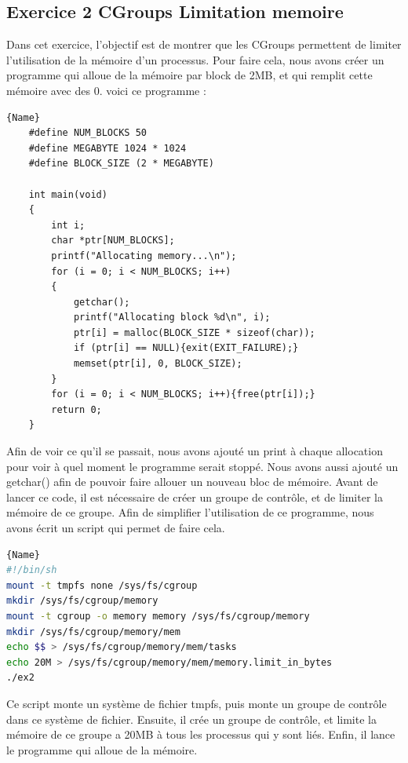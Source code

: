 \documentclass[
	a4paper, %
	10pt, %
]{CSUniSchoolLabReport}
\begin{document}
\subsection{Exercice 2 CGroups Limitation memoire}\label{MPEx2}
Dans cet exercice, l'objectif est de montrer que les CGroups permettent de limiter l'utilisation de la m\'emoire d'un processus.
Pour faire cela, nous avons créer un programme qui alloue de la m\'emoire par block de 2MB, et qui remplit cette m\'emoire avec des 0.
voici ce programme : \\
\begin{lstlisting}[style=CStyle, caption=Allocation de memoire, firstnumber=1]{Name}
	#define NUM_BLOCKS 50
	#define MEGABYTE 1024 * 1024
	#define BLOCK_SIZE (2 * MEGABYTE)
	
	int main(void)
	{
		int i;
		char *ptr[NUM_BLOCKS];
		printf("Allocating memory...\n");
		for (i = 0; i < NUM_BLOCKS; i++)
		{
			getchar();
			printf("Allocating block %d\n", i);
			ptr[i] = malloc(BLOCK_SIZE * sizeof(char));
			if (ptr[i] == NULL){exit(EXIT_FAILURE);}
			memset(ptr[i], 0, BLOCK_SIZE);
		}
		for (i = 0; i < NUM_BLOCKS; i++){free(ptr[i]);}
		return 0;
	}
\end{lstlisting}
Afin de voir ce qu'il se passait, nous avons ajout\'e un print \`a chaque allocation pour voir \`a quel moment le programme serait stoppé.
Nous avons aussi ajout\'e un getchar() afin de pouvoir faire allouer un nouveau bloc de m\'emoire.
\linebreak
Avant de lancer ce code, il est n\'ecessaire de créer un groupe de contr\^ole, et de limiter la m\'emoire de ce groupe. Afin de simplifier l'utilisation de ce programme, nous avons écrit un script qui permet de faire cela.

\begin{lstlisting}[language=bash, firstnumber=1]{Name}
#!/bin/sh
mount -t tmpfs none /sys/fs/cgroup
mkdir /sys/fs/cgroup/memory
mount -t cgroup -o memory memory /sys/fs/cgroup/memory
mkdir /sys/fs/cgroup/memory/mem
echo $$ > /sys/fs/cgroup/memory/mem/tasks
echo 20M > /sys/fs/cgroup/memory/mem/memory.limit_in_bytes
./ex2
\end{lstlisting}
Ce script monte un syst\`eme de fichier tmpfs, puis monte un groupe de contr\^ole dans ce syst\`eme de fichier.
Ensuite, il cr\'ee un groupe de contr\^ole, et limite la m\'emoire de ce groupe a 20MB \`a tous les processus qui y sont liés.
Enfin, il lance le programme qui alloue de la m\'emoire.
\end{document}
